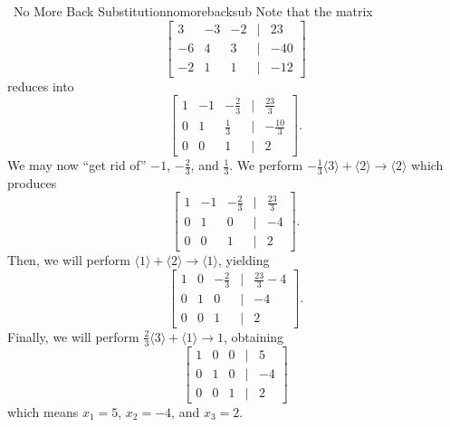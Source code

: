         \begin{example}{\Difficulty\,\Difficulty\,\,No More Back Substitution}{nomorebacksub}
            Note that the matrix 
            \begin{equation*}
                \begin{bmatrix} 3 & -3 & -2 &| &23 \\ -6 & 4 & 3 &| &-40 \\ -2 & 1 & 1 &| &-12 \end{bmatrix}
            \end{equation*}
            reduces into
            \begin{equation*}
                \begin{bmatrix} 1 & -1 & -\frac{2}{3} &| &\frac{23}{3} \\ 0 & 1 & \frac{1}{3} &| &-\frac{10}{3} \\ 0 & 0 & 1 &| &2 \end{bmatrix}.
            \end{equation*}
            We may now ``get rid of'' \(-1\), \(-\frac{2}{3}\), and \(\frac{1}{3}\). We perform \(-\frac{1}{3}\langle 3\rangle+\langle 2\rangle\to\langle2\rangle\) which produces
            \begin{equation*}
                \begin{bmatrix} 1 & -1 & -\frac{2}{3} &| &\frac{23}{3} \\ 0 & 1 & 0 &| & -4 \\ 0 & 0 & 1 & | & 2 \end{bmatrix}.
            \end{equation*}
            Then, we will perform \(\langle 1\rangle + \langle 2\rangle\to\langle1\rangle\), yielding
            \begin{equation*}
                \begin{bmatrix} 1 & 0 & -\frac{2}{3} &| & \frac{23}{3}-4 \\ 0 & 1 & 0 &| & -4 \\ 0 & 0 & 1 & | & 2 \end{bmatrix}.
            \end{equation*}
            Finally, we will perform \(\frac{2}{3}\langle3\rangle+\langle1\rangle\to 1\), obtaining
            \begin{equation*}
                \begin{bmatrix}
                1 & 0 & 0 & | & 5 \\
                0 & 1 & 0 & | & -4 \\
                0 & 0 & 1 & | & 2
            \end{bmatrix}
            \end{equation*}
            which means \(x_1=5\), \(x_2=-4\), and \(x_3=2\).
        \end{example}
